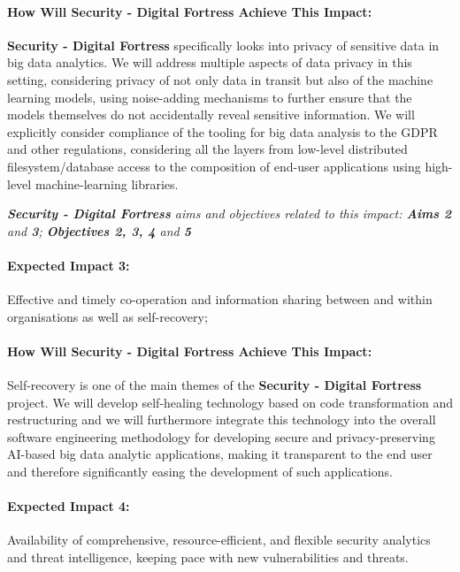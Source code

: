 \documentclass[a4paper,11pt]{article}
\newcommand{\project}[1]{\textbf{#1}\xspace}
\newcommand{\SECURITY}{\project{Security - Digital Fortress}}
\newcommand{\TheProject}{\SECURITY}
\begin{document}
\begin{mdframed}[backgroundcolor=gray!10]
\paragraph{How Will \TheProject{} Achieve This Impact:}
\TheProject{} specifically looks into privacy of sensitive data in big data analytics. We will address multiple aspects of data privacy in this setting, considering privacy of not only data in transit but also of the machine learning models, using noise-adding mechanisms to further ensure that the models themselves do not accidentally reveal sensitive information. We will explicitly consider compliance of the tooling for big data analysis to the GDPR and other regulations, considering all the layers from low-level distributed filesystem/database access to the composition of end-user applications using high-level machine-learning libraries.

\emph{\TheProject{} aims and objectives related to this impact: \textbf{Aims 2}  and \textbf{3}; \textbf{Objectives 2, 3, 4} and \textbf{5} }
\end{mdframed}

\begin{mdframed}[backgroundcolor=blue!5]
\paragraph{Expected Impact 3:}
Effective and timely co-operation and information sharing between and within organisations as well as self-recovery;
\end{mdframed}

\begin{mdframed}[backgroundcolor=gray!10]
\paragraph{How Will \TheProject{} Achieve This Impact:}
Self-recovery is one of the main themes of the \TheProject{} project. We will develop self-healing technology based on code transformation and restructuring and we will furthermore integrate this technology into the overall software engineering methodology for developing secure and privacy-preserving AI-based big data analytic applications, making it transparent to the end user and therefore significantly easing the development of such applications. 
\end{mdframed}

\begin{mdframed}[backgroundcolor=blue!5]
\paragraph{Expected Impact 4:}
Availability of comprehensive, resource-efficient, and flexible security analytics and threat intelligence, keeping pace with new vulnerabilities and threats.
\end{mdframed}
\end{document}
